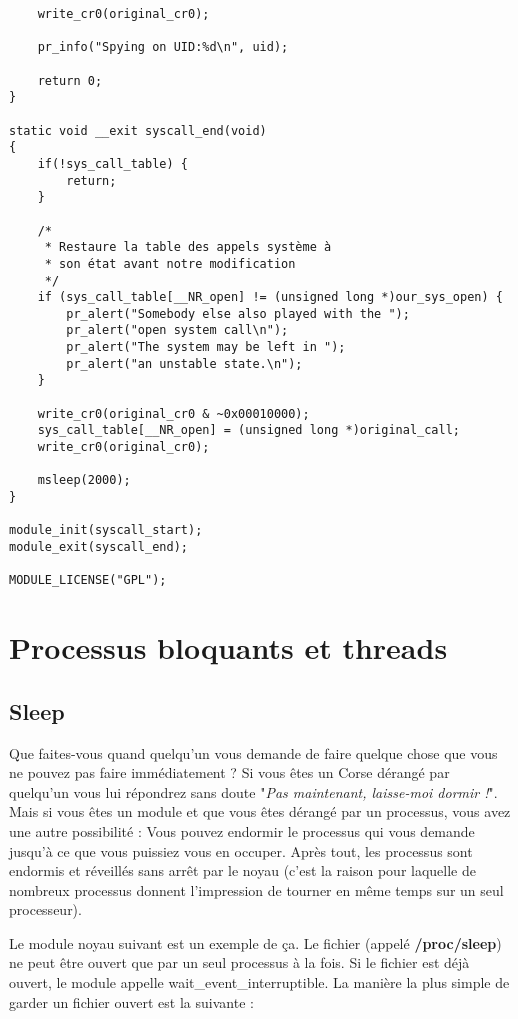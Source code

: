 \documentclass[11pt]{article}
\begin{document}
\begin{verbatim}
    write_cr0(original_cr0);

    pr_info("Spying on UID:%d\n", uid);

    return 0;
}

static void __exit syscall_end(void)
{
    if(!sys_call_table) {
        return;
    }

    /*
     * Restaure la table des appels système à
     * son état avant notre modification
     */
    if (sys_call_table[__NR_open] != (unsigned long *)our_sys_open) {
        pr_alert("Somebody else also played with the ");
        pr_alert("open system call\n");
        pr_alert("The system may be left in ");
        pr_alert("an unstable state.\n");
    }

    write_cr0(original_cr0 & ~0x00010000);
    sys_call_table[__NR_open] = (unsigned long *)original_call;
    write_cr0(original_cr0);

    msleep(2000);
}

module_init(syscall_start);
module_exit(syscall_end);

MODULE_LICENSE("GPL");
\end{verbatim}

\section*{Processus bloquants et threads}
\label{sec-11}
\subsection*{Sleep}
\label{sec-11-1}
Que faites-vous quand quelqu'un vous demande de faire quelque chose que vous ne pouvez pas faire immédiatement ? Si vous êtes un Corse dérangé par quelqu'un vous lui répondrez sans doute "\emph{Pas maintenant, laisse-moi dormir !}". Mais si vous êtes un module et que vous êtes dérangé par un processus, vous avez une autre possibilité : Vous pouvez endormir le processus qui vous demande jusqu'à ce que vous puissiez vous en occuper. Après tout, les processus sont endormis et réveillés sans arrêt par le noyau (c'est la raison pour laquelle de nombreux processus donnent l'impression de tourner en même temps sur un seul processeur).

Le module noyau suivant est un exemple de ça. Le fichier (appelé \textbf{/proc/sleep}) ne peut être ouvert que par un seul processus à la fois. Si le fichier est déjà ouvert, le module appelle wait\_event\_interruptible. La manière la plus simple de garder un fichier ouvert est la suivante :
\end{document}
